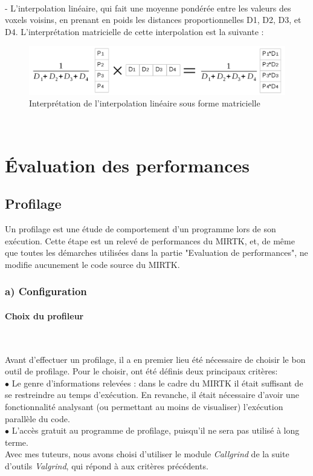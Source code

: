 \documentclass[10pt]{report}
\begin{document}
	~\par 
	- L'interpolation linéaire, qui fait une moyenne pondérée entre les valeurs des voxels voisins, en prenant en poids les distances proportionnelles D1, D2, D3, et D4. L'interprétation matricielle de cette interpolation est la suivante :
	\begin{figure}[h!]
		\begin{center}
			\includegraphics[width=16cm]{calcul_interp_lineaire.png}	
		\end{center}
		\caption{Interprétation de l'interpolation linéaire sous forme matricielle}
		\label{Interprétation de l'interpolation linéaire sous forme matricielle}
	\end{figure}
	~\par 

	

	\section{Évaluation des performances}
	\vspace{0.7cm}
		\subsection{Profilage}
Un profilage est une étude de comportement d'un programme lors de son exécution. Cette étape est un relevé de performances du MIRTK, et, de même que toutes les démarches utilisées dans la partie "Evaluation de performances", ne modifie aucunement le code source du MIRTK. 

\subsubsection{a) Configuration}
\vspace{0.7cm}
	\paragraph{Choix du profileur}~\par

Avant d'effectuer un profilage, il a en premier lieu été nécessaire de choisir le bon outil de profilage. Pour le choisir, ont été définis deux principaux critères:\\
{$\bullet$} Le genre d'informations relevées : dans le cadre du MIRTK il était suffisant de se restreindre au temps d'exécution. En revanche, il était nécessaire d'avoir une fonctionnalité analysant (ou permettant au moins de visualiser) l'exécution parallèle du code. \\
{$\bullet$} L'accès gratuit au programme de profilage, puisqu'il ne sera pas utilisé à long terme.\\
Avec mes tuteurs, nous avons choisi d'utiliser le module \textit{Callgrind} de la suite d'outils \textit{Valgrind}, qui répond à aux critères précédents.
\end{document}

